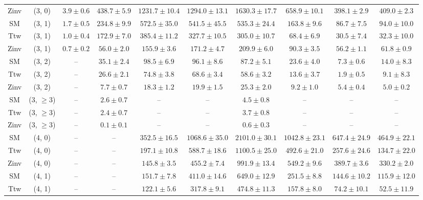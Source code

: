 \begin{table}[h!]
{\begin{tabular}{cccccccccc}
	Zinv & (3, 0) & $3.9\pm 0.6$ & $438.7\pm 5.9$ & $1231.7\pm 10.4$ & $1294.0\pm 13.1$ & $1630.3\pm 17.7$ & $658.9\pm 10.1$ & $398.1\pm 2.9$ & $409.0\pm 2.3$ \\[0.5ex] 
	SM & (3, 1) & $1.7\pm 0.5$ & $234.8\pm 9.9$ & $572.5\pm 35.0$ & $541.5\pm 45.5$ & $535.3\pm 24.4$ & $163.8\pm 9.6$ & $86.7\pm 7.5$ & $94.0\pm 10.0$ \\[0.5ex] 
	Ttw & (3, 1) & $1.0\pm 0.4$ & $172.9\pm 7.0$ & $385.4\pm 11.2$ & $327.7\pm 10.5$ & $305.0\pm 10.7$ & $68.4\pm 6.9$ & $30.5\pm 7.4$ & $32.3\pm 10.0$ \\[0.5ex] 
	Zinv & (3, 1) & $0.7\pm 0.2$ & $56.0\pm 2.0$ & $155.9\pm 3.6$ & $171.2\pm 4.7$ & $209.9\pm 6.0$ & $90.3\pm 3.5$ & $56.2\pm 1.1$ & $61.8\pm 0.9$ \\[0.5ex] 
	SM & (3, 2) & -- & $35.1\pm 2.4$ & $98.5\pm 6.9$ & $96.1\pm 8.6$ & $87.2\pm 5.1$ & $23.6\pm 4.0$ & $7.3\pm 0.6$ & $14.0\pm 8.3$ \\[0.5ex] 
	Ttw & (3, 2) & -- & $26.6\pm 2.1$ & $74.8\pm 3.8$ & $68.6\pm 3.4$ & $58.6\pm 3.2$ & $13.6\pm 3.7$ & $1.9\pm 0.5$ & $9.1\pm 8.3$ \\[0.5ex] 
	Zinv & (3, 2) & -- & $7.7\pm 0.7$ & $18.3\pm 1.2$ & $19.9\pm 1.5$ & $25.3\pm 2.0$ & $9.2\pm 1.0$ & $5.4\pm 0.4$ & $5.0\pm 0.2$ \\[0.5ex] 
	SM & (3, $\ge3$) & -- & $2.6\pm 0.7$ & -- & -- & $4.5\pm 0.8$ & -- & -- & -- \\[0.5ex] 
	Ttw & (3, $\ge3$) & -- & $2.4\pm 0.7$ & -- & -- & $3.7\pm 0.8$ & -- & -- & -- \\[0.5ex] 
	Zinv & (3, $\ge3$) & -- & $0.1\pm 0.1$ & -- & -- & $0.6\pm 0.3$ & -- & -- & -- \\[0.5ex] 
	SM & (4, 0) & -- & -- & $352.5\pm 16.5$ & $1068.6\pm 35.0$ & $2101.0\pm 30.1$ & $1042.8\pm 23.1$ & $647.4\pm 24.9$ & $464.9\pm 22.1$ \\[0.5ex] 
	Ttw & (4, 0) & -- & -- & $197.1\pm 10.8$ & $588.7\pm 18.6$ & $1100.5\pm 25.0$ & $492.6\pm 21.0$ & $257.6\pm 24.6$ & $134.7\pm 22.0$ \\[0.5ex] 
	Zinv & (4, 0) & -- & -- & $145.8\pm 3.5$ & $455.2\pm 7.4$ & $991.9\pm 13.4$ & $549.2\pm 9.6$ & $389.7\pm 3.6$ & $330.2\pm 2.0$ \\[0.5ex] 
	SM & (4, 1) & -- & -- & $151.7\pm 7.8$ & $411.0\pm 14.6$ & $649.0\pm 12.9$ & $251.5\pm 8.8$ & $144.6\pm 10.2$ & $115.9\pm 12.0$ \\[0.5ex] 
	Ttw & (4, 1) & -- & -- & $122.1\pm 5.6$ & $317.8\pm 9.1$ & $474.8\pm 11.3$ & $157.8\pm 8.0$ & $74.2\pm 10.1$ & $52.5\pm 11.9$ \\[0.5ex] 

\end{tabular}}
\end{table}
